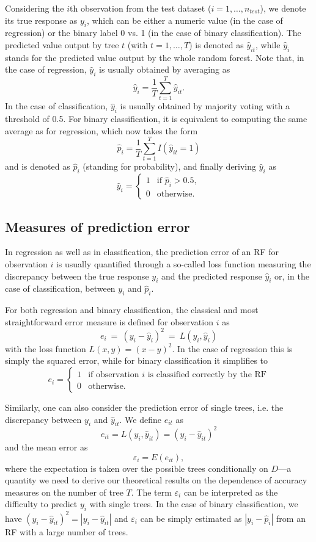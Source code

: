\documentclass[paper=a4
               ,12pt
               ,DIV=12
               ,parskip=half
               ,titlepage=on
               ,headinclude 
               ,footinclude
               ,headsepline
               ,footsepline         %
               ,ilines 
               ]{scrartcl}
\begin{document}
Considering the $i$th observation from the test dataset ($i=1,\dots,n_{test}$), we denote its true response as $y_i$, which can be either a numeric value (in the case of regression) or the binary label 0 vs. 1 (in the case of binary classification).
The predicted value output by tree $t$ (with $t=1,\dots,T$) is denoted as $\hat{y}_{it}$, while $\hat{y}_i$ stands for the predicted value output by the whole random forest. Note that, in the case of regression, $\hat{y}_i$ is usually obtained by averaging as 
\[
\hat{y}_i=\frac{1}{T}\sum_{t=1}^T\hat{y}_{it}.
\]
In the case of classification, $\hat{y}_i$ is usually obtained by majority voting with a threshold of 0.5. For binary classification, it is equivalent to computing the same average as for regression, which now takes the form
\[
\hat{p}_i=\frac{1}{T}\sum_{t=1}^TI ( \hat{y}_{it}=1 )
\] 
and is denoted as $\hat{p}_i$ (standing for probability), and finally deriving $\hat{y}_i$ as
\[
   \hat{y}_{i} =
   \begin{cases}     1 & \text{if }\hat{p}_i>0.5,  \\
     0 & \text{otherwise.}
   \end{cases}
\]


\subsection{Measures of prediction error}
\label{subsec:errormeasures}
In regression as well as in classification, the prediction error of an RF for observation $i$ is usually quantified through a so-called loss function measuring the discrepancy between the true response $y_i$ and the predicted response $\hat{y}_i$ or, in the case of classification, between $y_i$ and $\hat{p}_i$. 

For both regression and binary classification, the classical and most straightforward error measure is defined for observation $i$ as 
\[
e_{i}\ =\ (y_i-\hat{y}_{i})^2\ =\ L(y_i,\hat{y}_{i})
\]
with the loss function $L(x,y)=(x-y)^2$. In the case of regression this is simply the squared error, while for binary classification it simplifies to
\[
   e_{i} =
   \begin{cases}     1 & \text{if observation } i \text{ is classified correctly by the RF}  \\
     0 & \text{otherwise.}
   \end{cases}
\]

Similarly, one can also consider the prediction error of single trees, i.e. the discrepancy between $y_i$ and $\hat{y}_{it}$. We define $e_{it}$ as 
\[
e_{it}=L(y_i,\hat{y}_{it})=(y_i-\hat{y}_{it})^2
\]
and the mean error as
\[
\varepsilon_i = E(e_{it}),
\]
where the expectation is taken over the possible trees conditionally on $D$---a quantity we need to derive our theoretical results on the dependence of accuracy measures on the number of tree $T$. The term $\varepsilon_i$ can be interpreted as the difficulty to predict $y_i$ with single trees. 
In the case of binary classification, we have $(y_i-\hat{y}_{it})^2=|y_i-\hat{y}_{it}|$ and $\varepsilon_i$ can be simply estimated as $|y_i-\hat{p}_i|$  from an RF with a large number of trees. 
\end{document}
